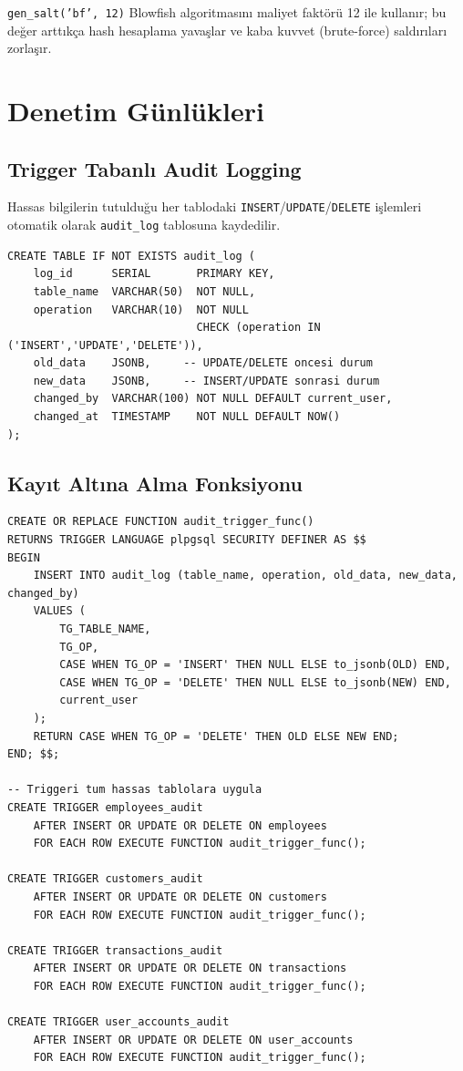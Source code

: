 \documentclass[12pt, a4paper]{report}
\begin{document}
\texttt{gen\_salt('bf', 12)} Blowfish algoritmasını maliyet faktörü 12 ile kullanır; bu değer arttıkça hash hesaplama yavaşlar ve kaba kuvvet (brute-force) saldırıları zorlaşır.

\chapter{Denetim Günlükleri}
\section{Trigger Tabanlı Audit Logging}

Hassas bilgilerin tutulduğu her tablodaki \texttt{INSERT}/\texttt{UPDATE}/\texttt{DELETE} işlemleri otomatik olarak \texttt{audit\_log} tablosuna kaydedilir.

\begin{lstlisting}[caption={Denetim günlüğü tablosu}]
CREATE TABLE IF NOT EXISTS audit_log (
    log_id      SERIAL       PRIMARY KEY,
    table_name  VARCHAR(50)  NOT NULL,
    operation   VARCHAR(10)  NOT NULL
                             CHECK (operation IN ('INSERT','UPDATE','DELETE')),
    old_data    JSONB,     -- UPDATE/DELETE oncesi durum
    new_data    JSONB,     -- INSERT/UPDATE sonrasi durum
    changed_by  VARCHAR(100) NOT NULL DEFAULT current_user,
    changed_at  TIMESTAMP    NOT NULL DEFAULT NOW()
);
\end{lstlisting}

\section{Kayıt Altına Alma Fonksiyonu}

\begin{lstlisting}[caption={Genel amaçlı audit trigger (07\_audit\_log.sql)}]
CREATE OR REPLACE FUNCTION audit_trigger_func()
RETURNS TRIGGER LANGUAGE plpgsql SECURITY DEFINER AS $$
BEGIN
    INSERT INTO audit_log (table_name, operation, old_data, new_data, changed_by)
    VALUES (
        TG_TABLE_NAME,
        TG_OP,
        CASE WHEN TG_OP = 'INSERT' THEN NULL ELSE to_jsonb(OLD) END,
        CASE WHEN TG_OP = 'DELETE' THEN NULL ELSE to_jsonb(NEW) END,
        current_user
    );
    RETURN CASE WHEN TG_OP = 'DELETE' THEN OLD ELSE NEW END;
END; $$;

-- Triggeri tum hassas tablolara uygula
CREATE TRIGGER employees_audit
    AFTER INSERT OR UPDATE OR DELETE ON employees
    FOR EACH ROW EXECUTE FUNCTION audit_trigger_func();

CREATE TRIGGER customers_audit
    AFTER INSERT OR UPDATE OR DELETE ON customers
    FOR EACH ROW EXECUTE FUNCTION audit_trigger_func();

CREATE TRIGGER transactions_audit
    AFTER INSERT OR UPDATE OR DELETE ON transactions
    FOR EACH ROW EXECUTE FUNCTION audit_trigger_func();

CREATE TRIGGER user_accounts_audit
    AFTER INSERT OR UPDATE OR DELETE ON user_accounts
    FOR EACH ROW EXECUTE FUNCTION audit_trigger_func();
\end{lstlisting}
\end{document}
